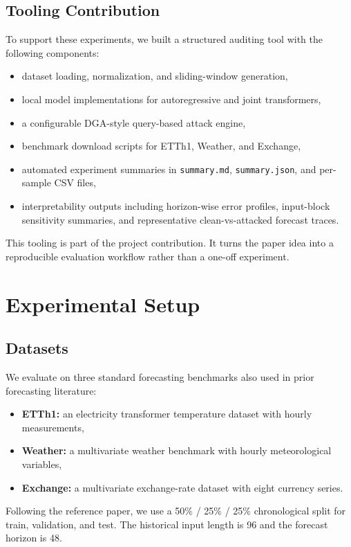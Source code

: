 \documentclass[11pt]{article}
\begin{document}
\subsection{Tooling Contribution}
To support these experiments, we built a structured auditing tool with the following components:
\begin{itemize}
  \item dataset loading, normalization, and sliding-window generation,
  \item local model implementations for autoregressive and joint transformers,
  \item a configurable DGA-style query-based attack engine,
  \item benchmark download scripts for ETTh1, Weather, and Exchange,
  \item automated experiment summaries in \texttt{summary.md}, \texttt{summary.json}, and per-sample CSV files,
  \item interpretability outputs including horizon-wise error profiles, input-block sensitivity summaries, and representative clean-vs-attacked forecast traces.
\end{itemize}

This tooling is part of the project contribution. It turns the paper idea into a reproducible evaluation workflow rather than a one-off experiment.

\section{Experimental Setup}
\subsection{Datasets}
We evaluate on three standard forecasting benchmarks also used in prior forecasting literature:
\begin{itemize}
  \item \textbf{ETTh1:} an electricity transformer temperature dataset with hourly measurements,
  \item \textbf{Weather:} a multivariate weather benchmark with hourly meteorological variables,
  \item \textbf{Exchange:} a multivariate exchange-rate dataset with eight currency series.
\end{itemize}

Following the reference paper, we use a 50\% / 25\% / 25\% chronological split for train, validation, and test. The historical input length is 96 and the forecast horizon is 48.
\end{document}
